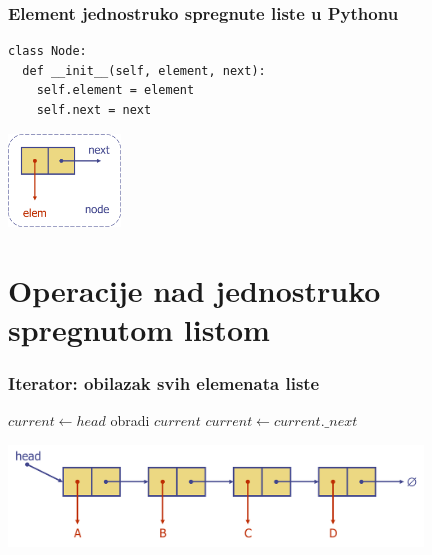 \documentclass[compress]{beamer}
\begin{document}
\begin{frame}[fragile]
  \frametitle{Element jednostruko spregnute liste u Pythonu}
\begin{verbatim}
class Node:
  def __init__(self, element, next):
    self.element = element
    self.next = next
\end{verbatim}
  \begin{center}
    \includegraphics[width=3cm]{asp-07-pic01.png}
  \end{center}
\end{frame}

\section[Operacije]{Operacije nad jednostruko spregnutom listom}
\begin{frame}[fragile]
  \frametitle{Iterator: obilazak svih elemenata liste}
\begin{algorithmic}
\STATE $current \leftarrow head$
  \STATE obradi $current$
  \STATE $current \leftarrow current.\_next$
\ENDWHILE
\end{algorithmic}
  \begin{center}
    \includegraphics[width=11cm]{asp-07-pic02.png}
  \end{center}
\end{frame}
\end{document}
